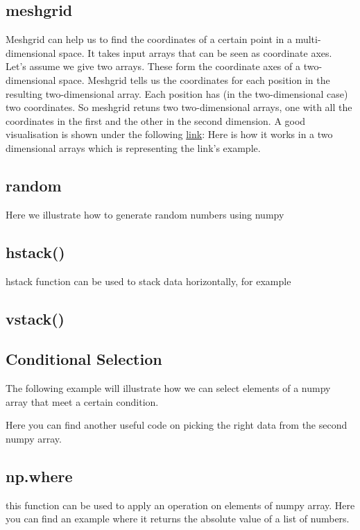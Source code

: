 \documentclass[10pt,a4paper]{article}
\begin{document}
\subsection{meshgrid}
Meshgrid can help us to find the coordinates of a certain point in a multi-dimensional space. It takes input arrays that can be seen as coordinate axes. Let's assume we give two arrays. These form the coordinate axes of a two-dimensional space. Meshgrid tells us the coordinates for each position in the resulting two-dimensional array. Each position has (in the two-dimensional case) two coordinates. So meshgrid retuns two two-dimensional arrays, one with all the coordinates in the first and the other in the second dimension. A good visualisation is shown under the following 
\href{https://browse.startpage.com/do/show_picture.pl?l=english&rais=1&oiu=https%3A%2F%2Fi.stack.imgur.com%2F8Mbig.png&sp=68ba4eb553807530320e70250d5a4696&t=default}{link}:
Here is how it works in a two dimensional arrays which is representing the link's example.



\subsection{random}
Here we illustrate how to generate random numbers using numpy



\subsection{hstack()}
hstack function can be used to stack data horizontally, for example



\subsection{vstack()}

\subsection{Conditional Selection}
The following example will illustrate how we can select elements of a numpy array that meet a certain condition. 

Here you can find another useful code on picking the right data from the second numpy array.



\subsection{np.where}
this function can be used to apply an operation on elements of numpy array. Here you can find an example where it returns the absolute value of a list of numbers.

\end{document}

